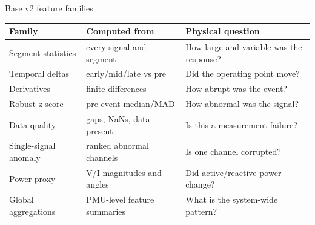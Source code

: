 \documentclass[10pt,aspectratio=169]{beamer}
\begin{document}
\begin{frame}{Base v2 feature families}
\small
\centering
\begin{tabular}{p{}p{}p{}}
\toprule
\textbf{Family} & \textbf{Computed from} & \textbf{Physical question}\\
\midrule
Segment statistics & every signal and segment & How large and variable was the response?\\
Temporal deltas & early/mid/late vs pre & Did the operating point move?\\
Derivatives & finite differences & How abrupt was the event?\\
Robust z-score & pre-event median/MAD & How abnormal was the signal?\\
Data quality & gaps, NaNs, data-present & Is this a measurement failure?\\
Single-signal anomaly & ranked abnormal channels & Is one channel corrupted?\\
Power proxy & V/I magnitudes and angles & Did active/reactive power change?\\
Global aggregations & PMU-level feature summaries & What is the system-wide pattern?\\
\bottomrule
\end{tabular}
\end{frame}
\end{document}
